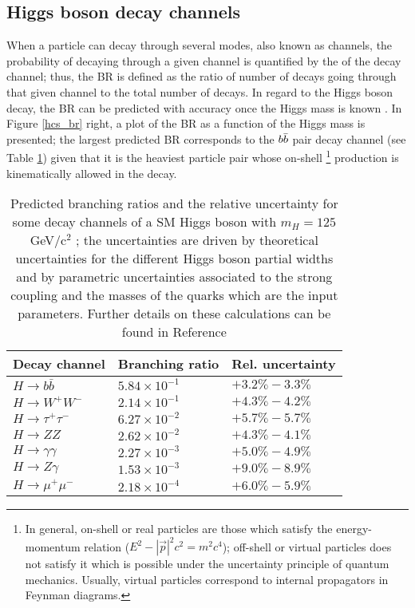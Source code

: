 \subsection{Higgs boson decay channels}\label{sec:decays}

When a particle can decay through several modes, also known as channels, the probability of decaying through a given channel is quantified by the  of the decay channel; thus, the BR is defined as the ratio of number of decays going through that given channel to the total number of decays. In regard to the Higgs boson decay, the BR can be predicted with accuracy once the Higgs mass is known \cite{riley, denner}. In Figure \ref{hcs_br} right, a plot of the BR as a function of the Higgs mass is presented; the largest predicted BR corresponds to the $b\bar{b}$ pair decay channel (see Table \ref{hdbr}) given that it is the heaviest particle pair whose on-shell \footnote{In general, on-shell or real particles are those which satisfy the energy-momentum relation ($E^2-|\vec{p}|^2c^2= m^2c^4$); off-shell or virtual particles does not satisfy it which is possible under the uncertainty principle of quantum mechanics. Usually, virtual particles correspond to internal propagators in Feynman diagrams.} production is kinematically allowed in the decay.

\begin{center}
\begin{table}[h]
\centering
\begin{tabular}{lll}\hline
Decay channel       & Branching ratio   & Rel. uncertainty\\\hline
$H\to b\bar{b}$     & $5.84\times10^{-1}$ & $+3.2\%-3.3\%$\\
$H\to W^+W^-$       & $2.14\times10^{-1}$ & $+4.3\%-4.2\%$\\
$H\to\tau^+\tau^-$  & $6.27\times10^{-2}$ & $+5.7\%-5.7\%$\\
$H\to ZZ$           & $2.62\times10^{-2}$ & $+4.3\%-4.1\%$\\
$H\to \gamma\gamma$ & $2.27\times10^{-3}$ & $+5.0\%-4.9\%$\\
$H\to Z\gamma$      & $1.53\times10^{-3}$ & $+9.0\%-8.9\%$\\
$H\to\mu^+\mu^-$    & $2.18\times10^{-4}$ & $+6.0\%-5.9\%$\\\hline
\end{tabular}
\caption[Predicted branching ratios for a SM Higgs boson with $m_H = 125$ GeV/c$^2$.]{Predicted branching ratios and the relative uncertainty for some decay channels of a SM Higgs boson with $m_H = 125$GeV/c$^2$ \cite{pdg}; the uncertainties are driven by theoretical uncertainties for the different Higgs boson partial widths and by parametric uncertainties associated to the strong coupling and the masses of the quarks which are the input parameters. Further details on these calculations can be found in Reference \cite{florian}}\label{hdbr}
\end{table}
\end{center}


